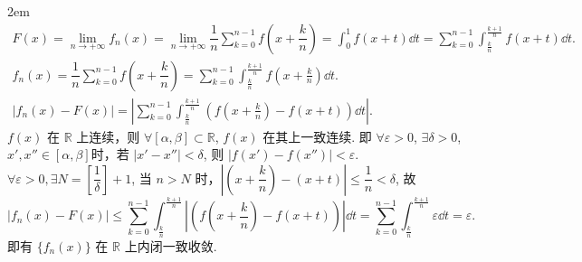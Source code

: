 \documentclass[UTF8,14pt,normal]{ctexart}
\begin{document}
    \hangindent 2em
    \noindent
    \begin{gather*}
        F(x) = \lim_{n \to +\infty} f_n(x) = \lim_{n \to +\infty} \dfrac{1}{n} \sum_{k = 0}^{n - 1} f(x + \dfrac{k}{n}) = \int_{0}^{1} f(x + t) \dd{t} = \sum_{k = 0}^{n - 1} \int_{\frac{k}{n}}^{\frac{k + 1}{n}} f(x + t) \dd{t}.\\
        f_n(x) = \dfrac{1}{n} \sum_{k = 0}^{n - 1} f(x + \dfrac{k}{n}) = \sum_{k = 0}^{n - 1} \int_{\frac{k}{n}}^{\frac{k + 1}{n}} f(x + \frac{k}{n}) \dd{t}. \\
        \lvert f_n(x) - F(x) \rvert = \left\lvert \sum_{k = 0}^{n - 1} \int_{\frac{k}{n}}^{\frac{k + 1}{n}} (f(x + \frac{k}{n}) - f(x + t)) \dd{t} \right\rvert.
    \end{gather*}
    \(f(x)\) 在 \(\mathbb{R}\) 上连续，则 \(\forall [\alpha, \beta] \subset \mathbb{R}\), \(f(x)\) 在其上一致连续. 即 \(\forall \varepsilon > 0\), \(\exists \delta > 0\), \(x', x'' \in [\alpha, \beta]\)时，若 \(\lvert x' - x'' \rvert < \delta\), 则 \(\lvert f(x') - f(x'') \rvert < \varepsilon\). \\[1.2ex]
    \(\forall \varepsilon > 0, \exists N = \left[ \dfrac{1}{\delta} \right] + 1\), 当 \(n > N\) 时，\(\left\lvert (x + \dfrac{k}{n}) - (x + t) \right\rvert \leqslant \dfrac{1}{n} < \delta\), 故 \[
        \lvert f_n(x) - F(x) \rvert \leqslant \sum_{k = 0}^{n - 1} \int_{\frac{k}{n}}^{\frac{k + 1}{n}} \left\lvert (f(x + \frac{k}{n}) - f(x + t)) \right\rvert \dd{t} = \sum_{k = 0}^{n - 1} \int_{\frac{k}{n}}^{\frac{k + 1}{n}} \varepsilon \dd{t} = \varepsilon.
    \]
    即有 \(\{f_n(x)\}\) 在 \(\mathbb{R}\) 上内闭一致收敛.
\end{document}
